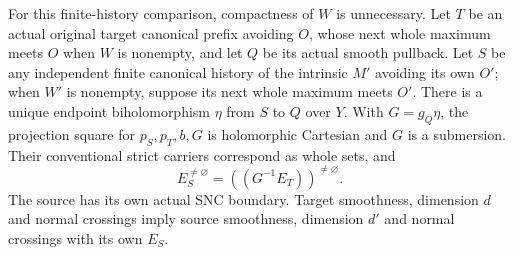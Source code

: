 \begin{theorem}
\label{hir:original-pure-boundary-independent-intrinsic-comparison}
\leanok
For this finite-history comparison, compactness of $W$ is unnecessary.
Let $T$ be an actual original target canonical prefix avoiding $O$,
whose next whole maximum meets $O$ when $W$ is nonempty, and let $Q$ be
its actual smooth pullback.  Let $S$ be any independent finite canonical
history of the intrinsic $M'$ avoiding its own $O'$; when $W'$ is
nonempty, suppose its next whole maximum meets $O'$.
There is a unique endpoint biholomorphism $\eta$ from $S$ to $Q$ over
$Y$.  With $G=g_Q\eta$, the projection square for $p_S,p_T,b,G$ is
holomorphic Cartesian and $G$ is a submersion.  Their conventional strict
carriers correspond as whole sets, and
\[
 E_S^{\ne\varnothing}=((G^{-1}E_T))^{\ne\varnothing}.
\]
The source has its own actual SNC boundary.  Target smoothness,
dimension $d$ and normal crossings imply source smoothness, dimension
$d'$ and normal crossings with its own $E_S$.
\end{theorem}
